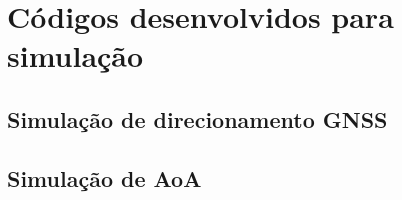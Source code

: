 \chapter{Códigos desenvolvidos para simulação}

\section{Simulação de direcionamento GNSS}



\section{Simulação de AoA}













